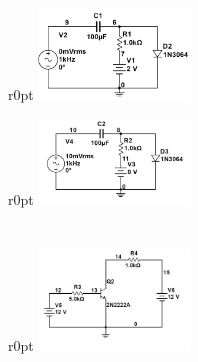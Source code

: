 \documentclass[UTF8,a4paper,12pt]{ctexart}
\begin{document}
\section{}
\subsection{}
\begin {wrapfigure}{r}{0pt}
\includegraphics [width=40mm]{cap/10.JPG}
\end {wrapfigure}

\begin {wrapfigure}{r}{0pt}
\includegraphics [width=40mm]{cap/11.JPG}
\end {wrapfigure}
\section{}
\begin {wrapfigure}{r}{0pt}
\includegraphics [width=40mm]{cap/12.JPG}
\end {wrapfigure}

\end{document}
